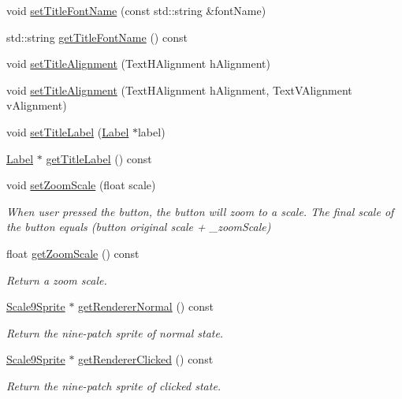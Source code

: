 \begin{DoxyCompactItemize}
void \hyperlink{classui_1_1Button_a6499a94c97443010373dbf217d5bdeee}{set\+Title\+Font\+Name} (const std\+::string \&font\+Name)
\item 
std\+::string \hyperlink{classui_1_1Button_aff1b77c013256e67d34aafa756e852db}{get\+Title\+Font\+Name} () const
\item 
void \hyperlink{classui_1_1Button_ade7fbe8fe353d065bdcbfcaaffdfde06}{set\+Title\+Alignment} (Text\+H\+Alignment h\+Alignment)
\item 
void \hyperlink{classui_1_1Button_a3934c4f1584202d1716382fdf0c1edf1}{set\+Title\+Alignment} (Text\+H\+Alignment h\+Alignment, Text\+V\+Alignment v\+Alignment)
\item 
void \hyperlink{classui_1_1Button_aaae3e845a20b8281d2d42eb277eda6e7}{set\+Title\+Label} (\hyperlink{classLabel}{Label} $\ast$label)
\item 
\hyperlink{classLabel}{Label} $\ast$ \hyperlink{classui_1_1Button_acf61a4761360fa161cb55d73ded122a0}{get\+Title\+Label} () const
\item 
void \hyperlink{classui_1_1Button_a98d035c3a2063f057715a9131174e3e0}{set\+Zoom\+Scale} (float scale)
\begin{DoxyCompactList}\small\item\em When user pressed the button, the button will zoom to a scale. The final scale of the button equals (button original scale + \+\_\+zoom\+Scale) \end{DoxyCompactList}\item 
float \hyperlink{classui_1_1Button_a32a4bc104062bb054ea294865062601d}{get\+Zoom\+Scale} () const
\begin{DoxyCompactList}\small\item\em Return a zoom scale. \end{DoxyCompactList}\item 
\hyperlink{classui_1_1Scale9Sprite}{Scale9\+Sprite} $\ast$ \hyperlink{classui_1_1Button_afcdcb5e3100669ad291c27cf2ae57e19}{get\+Renderer\+Normal} () const
\begin{DoxyCompactList}\small\item\em Return the nine-\/patch sprite of normal state. \end{DoxyCompactList}\item 
\hyperlink{classui_1_1Scale9Sprite}{Scale9\+Sprite} $\ast$ \hyperlink{classui_1_1Button_a523675e1698203d0fd683307e6458bc2}{get\+Renderer\+Clicked} () const
\begin{DoxyCompactList}\small\item\em Return the nine-\/patch sprite of clicked state. \end{DoxyCompactList}\item 

\end{DoxyCompactItemize}
